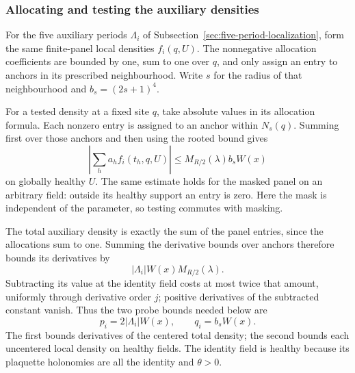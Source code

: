 \subsubsection{Allocating and testing the auxiliary densities}
For the five auxiliary periods $\Lambda_i$ of
Subsection~\ref{sec:five-period-localization}, form the same
finite-panel local densities $f_i(q,U)$. The nonnegative
allocation coefficients are bounded by one, sum to one over
$q$, and only assign an entry to anchors in its prescribed
neighbourhood. Write $s$ for the radius of that neighbourhood
and $b_s=(2s+1)^4$.

For a tested density at a fixed site $q$, take absolute values
in its allocation formula. Each nonzero entry is assigned to
an anchor within $N_s(q)$. Summing first over those anchors
and then using the rooted bound gives
\begin{equation}\label{eq:projected-local-test}
  \left|\sum_h a_h f_i(t_h,q,U)\right|
                         \le M_{R/2}(\lambda)b_sW(x)
\end{equation}
on globally healthy $U$. The same estimate holds for the
masked panel on an arbitrary field: outside its healthy support
an entry is zero. Here the mask is independent of the parameter,
so testing commutes with masking.

The total auxiliary density is exactly the sum of the panel
entries, since the allocations sum to one. Summing the derivative
bounds over anchors therefore bounds its derivatives by
\[ |\Lambda_i|W(x)M_{R/2}(\lambda). \]
Subtracting its value at the
identity field costs at most twice that amount, uniformly through
derivative order $j$; positive derivatives of the subtracted
constant vanish. Thus the two probe bounds needed below are
\begin{equation}\label{eq:projected-probe-prices}
                     p_i=2|\Lambda_i|W(x),\qquad q_i=b_sW(x).
\end{equation}
The first bounds derivatives of the centered total density;
the second bounds each uncentered local density on healthy fields.
The identity field is healthy because its plaquette holonomies
are all the identity and $\theta>0$.

